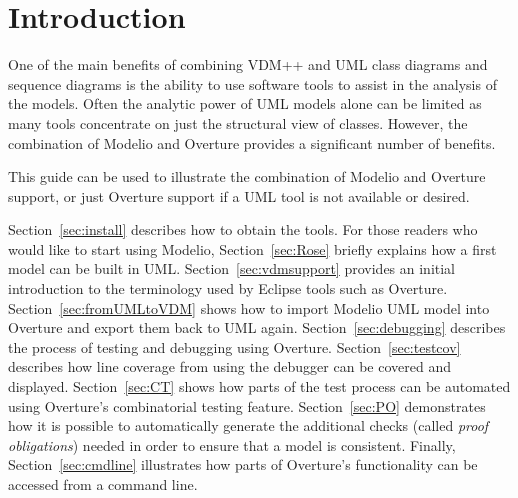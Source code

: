 


\section{Introduction}

One of the main benefits of combining VDM++ and UML class diagrams and
sequence diagrams is
the ability to use software tools to assist in the analysis of the
models. Often the analytic power of UML models alone can be limited as
many tools concentrate on just the structural view of
classes. However, the combination of Modelio
and
Overture provides a significant number of benefits.

This guide can be used to illustrate the combination of Modelio
and
Overture support, or just Overture support if a UML tool is
not available or desired.

Section~\ref{sec:install} describes how to obtain the tools.
For those readers who would like to start using
Modelio, Section~\ref{sec:Rose} briefly explains how a
first model can be built in UML.  Section~\ref{sec:vdmsupport}
provides an initial introduction to the terminology used by Eclipse
tools such as Overture. Section~\ref{sec:fromUMLtoVDM} shows how to
import Modelio UML model into Overture and
export them back to UML again.
Section~\ref{sec:debugging} describes the process of testing and
debugging using Overture. Section~\ref{sec:testcov}  describes how
line coverage from using the debugger can be covered and displayed.
Section~\ref{sec:CT} shows how parts of the test process can be
automated using Overture's combinatorial testing feature.
Section~\ref{sec:PO} demonstrates how it is possible to automatically
generate the additional checks (called \emph{proof obligations}) needed
in order to ensure that a model is
consistent.  Finally, Section~\ref{sec:cmdline} illustrates how parts
of Overture's functionality can be accessed from a command line.




